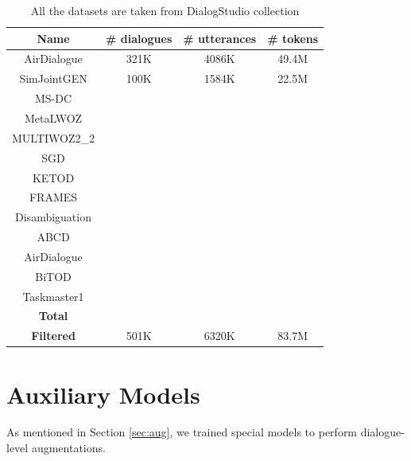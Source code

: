 \documentclass{article}
\begin{document}
\begin{table}[!htb]
    \centering
    \begin{tabular}{c|c|c|c}
        Name & \# dialogues & \# utterances & \# tokens \\
        \hline
        AirDialogue & 321K & 4086K & 49.4M \\
        SimJointGEN & 100K & 1584K & 22.5M \\
        MS-DC & & & \\
        MetaLWOZ & & & \\
        MULTIWOZ2\_2 & & & \\
        SGD & & & \\
        KETOD & & & \\
        FRAMES & & & \\
        Disambiguation & & & \\
        ABCD & & & \\
        AirDialogue & & & \\
        BiTOD & & & \\
        Taskmaster1 & & & \\
        \textbf{Total} & & & \\
        \textbf{Filtered} & 501K & 6320K & 83.7M
    \end{tabular}
    \caption{All the datasets are taken from DialogStudio collection \cite{zhang2023dialogstudio}}
    \label{tab:dataset}
\end{table}

\section{Auxiliary Models} \label{app:aug}

As mentioned in Section \ref{sec:aug}, we trained special models to perform dialogue-level augmentations.
\end{document}
